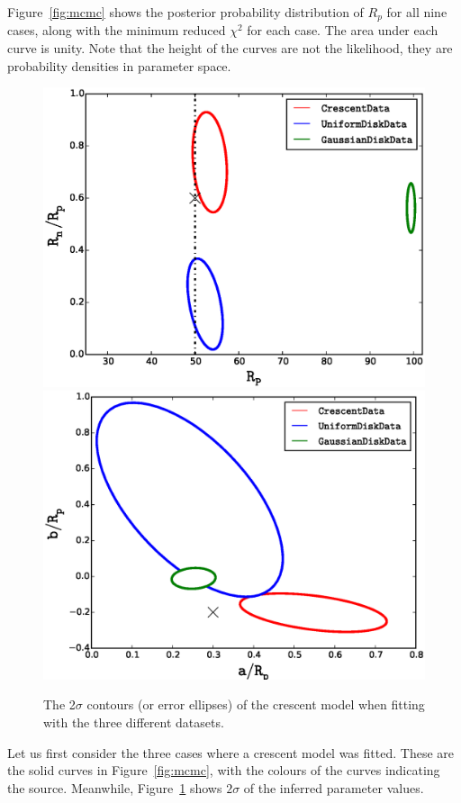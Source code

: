 Figure~\ref{fig:mcmc} shows the posterior probability distribution of
$R_p$ for all nine cases, along with the minimum reduced $\chi^2$ for
each case.  The area under each curve is unity. Note that the height
of the curves are not the likelihood, they are probability densities
in parameter space.

\begin{figure}
\centering
  \includegraphics[width=0.9\hsize,bb=0 0 576 432
                  ]{plots/Rhalf_RnRp.eps}
  \includegraphics[width=0.9\hsize,bb=0 0 576 432
                  ]{plots/aRp_bRp.eps}
\caption{\label{fig:crescentfit} The 2$\sigma$ contours (or error ellipses)
  of the crescent model when fitting with the three different
  datasets.}
\end{figure}

Let us first consider the three cases where a crescent model was
fitted.  These are the solid curves in Figure~\ref{fig:mcmc}, with the
colours of the curves indicating the source.  Meanwhile,
Figure~\ref{fig:crescentfit} shows $2\sigma$ of the inferred parameter
values.

